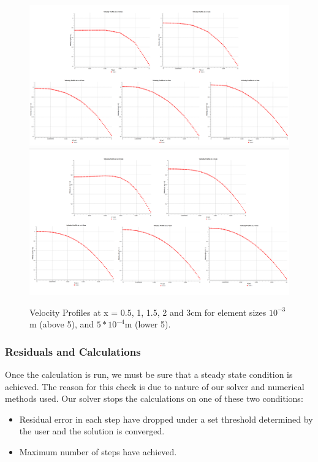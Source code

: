 \begin{figure}[H]
    \centering
    \includegraphics[width=15cm]{images/task1/e_03_total.png}
    \includegraphics[width=15cm]{images/task1/5e_04_total.png}
    \caption{Velocity Profiles at x = 0.5, 1, 1.5, 2 and 3cm for element sizes $10^{-3}$m (above 5), and $5*10^{-4}$m (lower 5).}
    \label{fig:axials}
\end{figure}



\subsubsection{Residuals and Calculations}
Once the calculation is run, we must be sure that a steady state condition is achieved. The reason for this check is due to nature of our solver and numerical methods used. Our solver stops the calculations on one of these two conditions:

\begin{itemize}
    \item Residual error in each step have dropped under a set threshold determined by the user and the solution is converged.
    \item Maximum number of steps have achieved.
\end{itemize}


